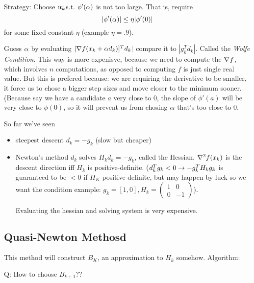 Strategy: Choose $\alpha_k$s.t. $\phi'(\alpha)$ is not too large. That is,
require $$|\phi'(\alpha)| \le \eta |\phi'(0)|$$ for some fixed constant
$\eta$ (example $\eta = .9$).

Guess $\alpha$ by evaluating $|\nabla f (x_k+\alpha d_k)]^Td_k|$ compare it
to $|g_k^Td_k|$. Called the \emph{Wolfe Condition}.
This way is more expenisve, because we need to compute the $\nabla f$,
which involves $n$ computations, as opposed to computing $f$ is just
single real value. 
But this is prefered because: we are requiring the derivative to be
smaller, it force us to chose a bigger step sizes and move closer to
the minimum sooner. (Because say we have a candidate $a$ very close to
$0$, the slope of $\phi'(a)$ will be very close to $\phi(0)$, so it
will prevent us from chosing $\alpha$ that's too close to 0.

So far we've seen
\begin{itemize}
\item steepest descent $d_k = -g_k$ (slow but cheaper)
\item Newton's method $d_k$ solves $H_kd_k = -g_k$, called the
  Hessian. $\nabla^2 f(x_k)$ is the descent direction iff $H_k$ is
  positive-definite. ($d_k^Tg_k < 0 \rightarrow -g_k^TH_kg_k$ is guaranteed to be $< 0$ if $H_K$
positive-definite, but may happen by luck so we want the condition
example: $g_k=[1,0], H_k=(\begin{smallmatrix}  1 & 0 \\ 0 & -1 \end{smallmatrix})$).

Evaluating the hessian and solving system is very expensive.
\end{itemize}

\subsection{Quasi-Newton Methosd}
\label{sec:quasi-newton}

This method will construct $B_K$, an approximation to $H_k$ somehow.
Algorithm:
\begin{algorithmic}
  \ENDFOR
\end{algorithmic}
Q: How to choose $B_{k+1}$??

